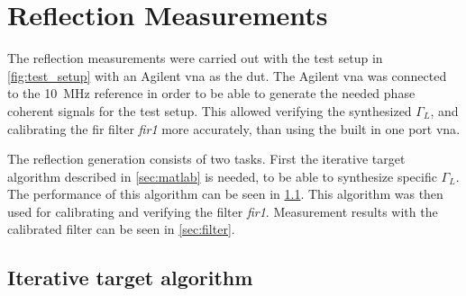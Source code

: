 \documentclass[12pt,a4paper,parskip=full,abstract=true,BCOR=10mm,twoside,open=right]{scrreprt}
\def\device#1{\textit{#1}}
\begin{document}

\section{Reflection Measurements}
\label{sec:reflection}

The reflection measurements were carried out with the test setup in \cref{fig:test_setup}
with an Agilent \gls{vna} as the \gls{dut}. The Agilent \gls{vna} was connected to the
\SI{10}{\mega\hertz} reference in order to be able to generate the needed phase coherent
signals for the test setup. This allowed verifying the synthesized $\Gamma_L$, and
calibrating the \gls{fir} filter \device{fir1} more accurately, than using the built
in one port \gls{vna}.

The reflection generation consists of two tasks. First the iterative target algorithm
described in \cref{sec:matlab} is needed, to be able to synthesize specific $\Gamma_L$.
The performance of this algorithm can be seen in \cref{sec:iterative}. This
algorithm was then used for calibrating and verifying the filter \device{fir1}. Measurement
results with the calibrated filter can be seen in \cref{sec:filter}.

\subsection{Iterative target algorithm}
\label{sec:iterative}
\end{document}
